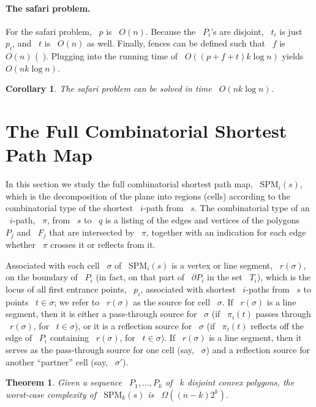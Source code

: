\documentclass[11pt]{article}
\newtheorem{theorem}{Theorem}
\newtheorem{corollary}{Corollary}
\begin{document}
\paragraph{The safari problem.}
For the safari problem, ~\(p\) is ~\(O(n)\).
Because the ~\(P_i\)'s are disjoint, ~\(t_i\) is just ~\(p_i\), and ~\(t\) is ~\(O(n)\) as well.
Finally, fences can be defined such that ~\(f\) is ~\(O(n)\) (~\cite{ref3}).
Plugging into the running time of ~\(O((p+f+t)k\log n)\) yields ~\(O(nk\log n)\).

\begin{corollary}
The safari problem can be solved in time ~\(O(nk\log n)\).
\end{corollary}

\section{The Full Combinatorial Shortest Path Map}

In this section we study the full combinatorial shortest path map, ~\(\text{SPM}_i(s)\), which is the decomposition of the plane into regions (cells) according to the combinatorial type of the shortest ~\(i\)-path from ~\(s\).
The combinatorial type of an ~\(i\)-path, ~\(\pi\), from ~\(s\) to ~\(q\) is a listing of the edges and vertices of the polygons ~\(P_j\) and ~\(F_j\) that are intersected by ~\(\pi\), together with an indication for each edge whether ~\(\pi\) crosses it or reflects from it.

Associated with each cell ~\(\sigma\) of ~\(\text{SPM}_i(s)\) is a vertex or line segment, ~\(r(\sigma)\), on the boundary of ~\(P_i\) (in fact, on that part of ~\(\partial P_i\) in the set ~\(T_i\)), which is the locus of all first entrance points, ~\(p_i\), associated with shortest ~\(i\)-paths from ~\(s\) to points ~\(t \in \sigma\); we refer to ~\(r(\sigma)\) as the source for cell ~\(\sigma\).
If ~\(r(\sigma)\) is a line segment, then it is either a pass-through source for ~\(\sigma\) (if ~\(\pi_i(t)\) passes through ~\(r(\sigma)\), for ~\(t \in \sigma\)), or it is a reflection source for ~\(\sigma\) (if ~\(\pi_i(t)\) reflects off the edge of ~\(P_i\) containing ~\(r(\sigma)\), for ~\(t \in \sigma\)).
If ~\(r(\sigma)\) is a line segment, then it serves as the pass-through source for one cell (say, ~\(\sigma\)) and a reflection source for another ``partner'' cell (say, ~\(\sigma'\)).

\begin{theorem}
\label{thm:spm-lower-bound}
Given a sequence ~\(P_1, \ldots, P_k\) of ~\(k\) disjoint convex polygons, the worst-case complexity of ~\(\text{SPM}_k(s)\) is ~\(\Omega((n-k)2^k)\).
\end{theorem}
\end{document}
